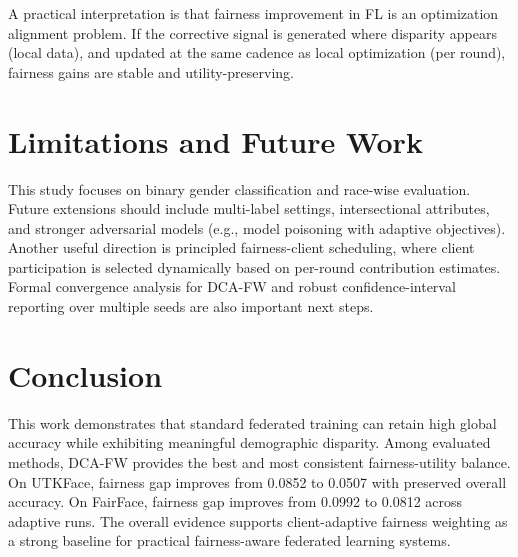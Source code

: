\documentclass[11pt,a4paper]{article}
\begin{document}
A practical interpretation is that fairness improvement in FL is an optimization alignment problem. If the corrective signal is generated where disparity appears (local data), and updated at the same cadence as local optimization (per round), fairness gains are stable and utility-preserving.

\section{Limitations and Future Work}
This study focuses on binary gender classification and race-wise evaluation. Future extensions should include multi-label settings, intersectional attributes, and stronger adversarial models (e.g., model poisoning with adaptive objectives). Another useful direction is principled fairness-client scheduling, where client participation is selected dynamically based on per-round contribution estimates. Formal convergence analysis for DCA-FW and robust confidence-interval reporting over multiple seeds are also important next steps.

\section{Conclusion}
This work demonstrates that standard federated training can retain high global accuracy while exhibiting meaningful demographic disparity. Among evaluated methods, DCA-FW provides the best and most consistent fairness-utility balance. On UTKFace, fairness gap improves from 0.0852 to 0.0507 with preserved overall accuracy. On FairFace, fairness gap improves from 0.0992 to 0.0812 across adaptive runs. The overall evidence supports client-adaptive fairness weighting as a strong baseline for practical fairness-aware federated learning systems.
\end{document}
